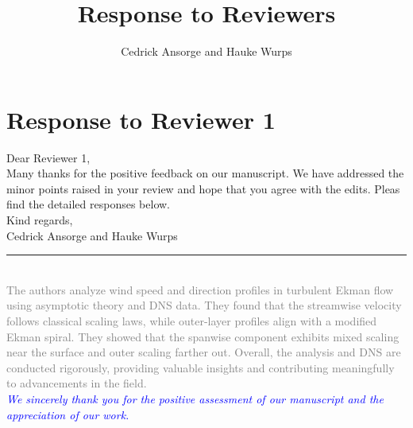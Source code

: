 \documentclass[a4paper,10pt]{article}
\title{Response to Reviewers}
\author{Cedrick Ansorge and Hauke Wurps }
\newcommand{\revpoint}[3] 
{ \hrule ~\\[0.5em]
\noindent\textcolor{gray}{\noindent#1} \\[0.5em]  
\noindent\textcolor{blue}{\textit{\noindent#2}} \\[0.5em]
\noindent\textcolor{black}{\noindent{#3}} \\[0.5em]
}
\begin{document}
\maketitle



\section*{Response to Reviewer 1}

Dear Reviewer 1, \\[1em]

\noindent Many thanks for the positive feedback on our manuscript. We have addressed the minor points raised in your review and hope that you agree with the edits. Pleas find the detailed responses below.  \\[1em]


\noindent Kind regards, \\[0.5em]

\noindent Cedrick Ansorge and Hauke Wurps  \\[0.5em]


\revpoint{The authors analyze wind speed and direction profiles in turbulent Ekman flow using asymptotic theory and DNS data. They found that the streamwise velocity follows classical scaling laws, while outer-layer profiles align with a modified Ekman spiral. They showed that the spanwise component exhibits mixed scaling near the surface and outer scaling farther out. \newline  Overall, the analysis and DNS are conducted rigorously, providing valuable insights and contributing meaningfully to advancements in the field.}{We sincerely thank you for the positive assessment of our manuscript and the appreciation of our work.}{}
\end{document}
